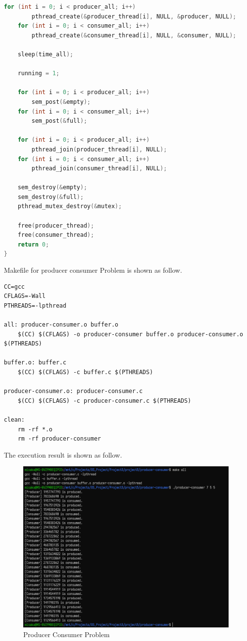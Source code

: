 \documentclass[UTF8,10pt,a4paper]{article}
\theoremstyle{Problem}
\theoremstyle{Solution}
\begin{document}
\begin{lstlisting}[language = c ]
    for (int i = 0; i < producer_all; i++)
		pthread_create(&producer_thread[i], NULL, &producer, NULL);
	for (int i = 0; i < consumer_all; i++)
		pthread_create(&consumer_thread[i], NULL, &consumer, NULL);

    sleep(time_all);

    running = 1;

    for (int i = 0; i < producer_all; i++)
		sem_post(&empty);
	for (int i = 0; i < consumer_all; i++)
		sem_post(&full);
    
    for (int i = 0; i < producer_all; i++)
		pthread_join(producer_thread[i], NULL);
	for (int i = 0; i < consumer_all; i++)
		pthread_join(consumer_thread[i], NULL);

    sem_destroy(&empty);
    sem_destroy(&full);
    pthread_mutex_destroy(&mutex);

    free(producer_thread);
    free(consumer_thread);
    return 0;
}
\end{lstlisting}

Makefile for producer consumer Problem is shown as follow.
\begin{lstlisting}
CC=gcc
CFLAGS=-Wall
PTHREADS=-lpthread

all: producer-consumer.o buffer.o
	$(CC) $(CFLAGS) -o producer-consumer buffer.o producer-consumer.o $(PTHREADS)

buffer.o: buffer.c
	$(CC) $(CFLAGS) -c buffer.c $(PTHREADS)

producer-consumer.o: producer-consumer.c
	$(CC) $(CFLAGS) -c producer-consumer.c $(PTHREADS)

clean:
	rm -rf *.o
	rm -rf producer-consumer
\end{lstlisting}


The execution result is shown as follow.
\begin{figure}[H]
    \centering
    \includegraphics[width=400pt]{2.png}
    \caption{Producer Consumer Problem}
    \label{3}
\end{figure}
\end{document}

